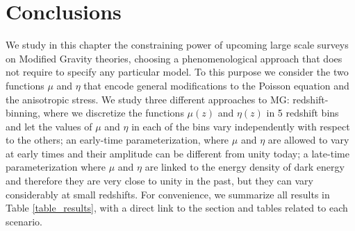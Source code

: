 \section{Conclusions}



We study in this chapter the constraining power of upcoming large scale surveys on Modified Gravity theories, choosing a phenomenological approach that does not require to specify any particular model. To this purpose we consider the two functions $\mu$ and $\eta$ that encode general modifications to the Poisson equation and the anisotropic stress.
We study three different approaches to MG: redshift-binning, where we discretize the functions $\mu(z)$ and $\eta(z)$ in 5 redshift bins and 
let the values of $\mu$ and $\eta$ in each of the bins vary independently with respect to the others; an early-time parameterization, where $\mu$ and $\eta$ are allowed to vary at early times and their amplitude
can be different from unity today; a late-time parameterization where  $\mu$ and $\eta$ are linked to the energy density of dark energy and therefore they are very
close to unity in the past, but they can vary considerably at small redshifts. For convenience, we summarize all results in Table \ref{table_results}, with a direct link to the section and tables related to each scenario.

